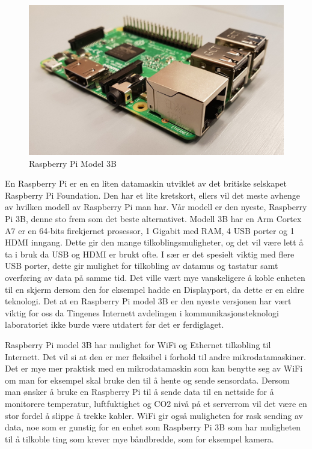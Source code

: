 \documentclass{article}
\begin{document}
\begin{figure}[h]
\centering
   \includegraphics[width=1\textwidth]{RPi1}
\caption{Raspberry Pi Model 3B}
\end{figure}

En Raspberry Pi\cite{rpi} er en en liten datamaskin utviklet av det britiske selskapet Raspberry Pi Foundation. Den har et lite kretskort, ellers vil det meste avhenge av hvilken modell av Raspberry Pi man har. Vår modell er den nyeste, Raspberry Pi 3B, denne sto frem som det beste alternativet. Modell 3B har en Arm Cortex A7 er en 64-bits firekjernet prosessor, 1 Gigabit med RAM, 4 USB porter og 1 HDMI inngang. Dette gir den mange tilkoblingsmuligheter, og det vil være lett å ta i bruk da USB og HDMI er brukt ofte. I sær er det spesielt viktig med flere USB porter, dette gir mulighet for tilkobling av datamus og tastatur samt overføring av data på samme tid. Det ville vært mye vanskeligere å koble enheten til en skjerm dersom den for eksempel hadde en Displayport, da dette er en eldre teknologi. Det at en Raspberry Pi model 3B er den nyeste versjonen har vært viktig for oss da Tingenes Internett avdelingen i kommunikasjonsteknologi laboratoriet ikke burde være utdatert før det er ferdiglaget.

Raspberry Pi model 3B har mulighet for WiFi og Ethernet tilkobling til Internett. Det vil si at den er mer fleksibel i forhold til andre mikrodatamaskiner. Det er mye mer praktisk med en mikrodatamaskin som kan benytte seg av WiFi om man for eksempel skal bruke den til å hente og sende sensordata. Dersom man ønsker å bruke en Raspberry Pi til å sende data til en nettside for å monitorere temperatur, luftfuktighet og CO2 nivå på et serverrom vil det være en stor fordel å slippe å trekke kabler. WiFi gir også muligheten for rask sending av data, noe som er gunstig for en enhet som Raspberry Pi 3B som har muligheten til å tilkoble ting som krever mye båndbredde, som for eksempel kamera. 
\end{document}
